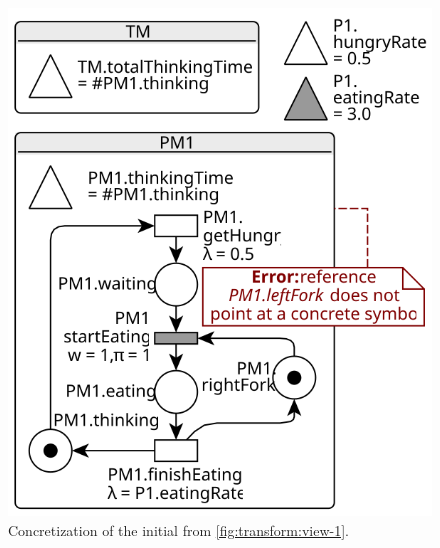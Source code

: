 \begin{figure}[p]%
  \begin{minipage}[t]{0.5\textwidth}
    \centering
    \includegraphics[scale=0.9]{figures/concrete_rgspn_example_initial}
    \caption{\protect\RaggedRight Concretization of the initial  from \vref{fig:transform:view-1}.}
    \label{fig:transform:concrete-1}
  \end{minipage}%
  \begin{minipage}[t]{0.5\textwidth}
    \centering

\end{minipage}
\end{figure}
